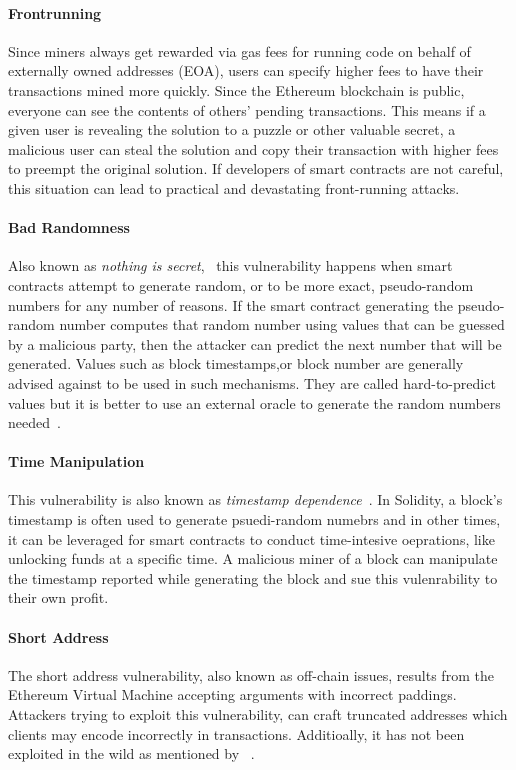             \paragraph{Frontrunning}
            Since miners always get rewarded via gas fees for running code on behalf of externally owned addresses (EOA), users can specify higher fees to have
            their transactions mined more quickly. Since the Ethereum blockchain is public, everyone can see the contents of others' pending transactions.
            This means if a given user is revealing the solution to a puzzle or other valuable secret, a malicious user can steal the solution and copy their transaction with
            higher fees to preempt the original solution.
            If developers of smart contracts are not careful, this situation can lead to practical and devastating front-running attacks.
                

            \paragraph{Bad Randomness}
            Also known as \textit{nothing is secret},~\cite{dasp} this vulnerability happens when smart contracts attempt to generate random, or to be more exact, pseudo-random numbers for any number of reasons.
            If the smart contract generating the pseudo-random number computes that random number using values that can be guessed by a malicious party, then the attacker can predict the next number that will be generated.
            Values such as block timestamps,or block number are generally advised against to be used in such mechanisms. They are called hard-to-predict values but it is better to use an external oracle to generate the random numbers needed~\cite{swcregistry}.
        
            \paragraph{Time Manipulation}
            This vulnerability is also known as \textit{timestamp dependence}~\cite{dasp}.
            In Solidity, a block's timestamp is often used to generate psuedi-random numebrs and in other times, it can be leveraged for smart contracts to conduct time-intesive oeprations, like unlocking funds at a specific time.
            A malicious miner of a block can manipulate the timestamp reported while generating the block and sue this vulenrability to their own profit. 
        
            \paragraph{Short Address}
            The short address vulnerability, also known as off-chain issues, results from the Ethereum Virtual Machine accepting arguments with incorrect paddings.
            Attackers trying to exploit this vulnerability, can craft truncated addresses which clients may encode incorrectly in transactions.
            Additioally, it has not been exploited in the wild as mentioned by ~\cite{ferreira2020smartbugs}.